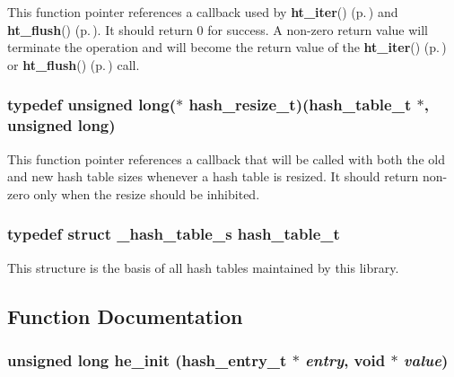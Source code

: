  This function pointer references a callback used by {\bf ht\_\-iter}() {\rm (p.\,\pageref{group__dbprim__hash_a11})} and {\bf ht\_\-flush}() {\rm (p.\,\pageref{group__dbprim__hash_a12})}. It should return 0 for success. A non-zero return value will terminate the operation and will become the return value of the {\bf ht\_\-iter}() {\rm (p.\,\pageref{group__dbprim__hash_a11})} or {\bf ht\_\-flush}() {\rm (p.\,\pageref{group__dbprim__hash_a12})} call. 
\subsubsection{\setlength{\rightskip}{0pt plus 5cm}typedef unsigned long($\ast$ hash\_\-resize\_\-t)({\bf hash\_\-table\_\-t} $\ast$, unsigned long)}\label{group__dbprim__hash_a5}




 This function pointer references a callback that will be called with both the old and new hash table sizes whenever a hash table is resized. It should return non-zero only when the resize should be inhibited. 
\subsubsection{\setlength{\rightskip}{0pt plus 5cm}typedef struct \_\-hash\_\-table\_\-s hash\_\-table\_\-t}\label{group__dbprim__hash_a0}




 This structure is the basis of all hash tables maintained by this library. 

\subsection{Function Documentation}
\subsubsection{\setlength{\rightskip}{0pt plus 5cm}unsigned long he\_\-init ({\bf hash\_\-entry\_\-t} $\ast$ {\em entry}, void $\ast$ {\em value})}\label{group__dbprim__hash_a15}




